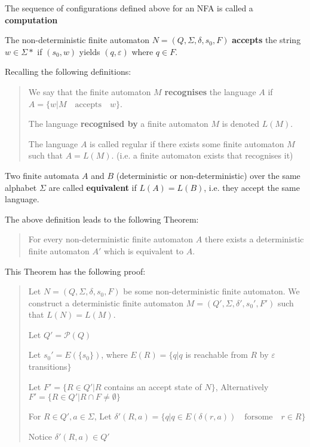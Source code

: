 \documentclass[11pt]{article}
\begin{document}
The sequence of configurations defined above for an NFA is called a \textbf{computation}
 
The non-deterministic finite automaton $N=(Q, \Sigma, \delta, s_0, F)$
\textbf{accepts} the string $w \in \Sigma\ast$ if $(s_0, w)$ yields $(q,
\varepsilon)$ where $q \in F$.

Recalling the following definitions:
\begin{quote}
We say that the finite automaton $M$ \textbf{recognises} the language $A$ if
$A=\{w|M \quad \mathrm{accepts} \quad w\}$.

The language \textbf{recognised by} a finite automaton $M$ is denoted $L(M)$.

The language $A$ is called regular if there exists some finite automaton $M$
such that $A = L(M)$. (i.e. a finite automaton exists that recognises it)
\end{quote}

Two finite automata $A$ and $B$ (deterministic or non-deterministic) over the same
alphabet $\Sigma$ are called \textbf{equivalent} if $L(A)=L(B)$, i.e. they
accept the same language.

The above definition leads to the following Theorem:
\begin{quote}
	For every non-deterministic finite automaton $A$ there exists a deterministic
	finite automaton $A'$ which is equivalent to $A$.
\end{quote}

This Theorem has the following proof:
\begin{quote}
	Let $N=(Q,\Sigma,\delta,s_0,F)$ be some non-deterministic finite automaton. We
	construct a deterministic finite automaton $M=(Q',\Sigma,\delta',s_0',F')$
	such that $L(N) = L(M)$.

	Let $Q'=\mathcal{P}(Q)$

	Let $s_0' = E(\{s_0\})$,
	where $E(R)= \{q|q$ is reachable from $R$ by $\varepsilon$ transitions$\}$

	Let $F'=\{R \in Q'|R$ contains an accept state of $N\}$, Alternatively $F'=\{R
	\in Q'|R \cap F \neq \emptyset\}$

	For $R \in Q', a \in \Sigma$, Let $\delta'(R,a)=\{q|q \in E(\delta(r,a)) \quad
	\mathrm{for some} \quad r \in R\}$

	Notice $\delta'(R,a) \in Q'$
\end{quote}
\end{document}
